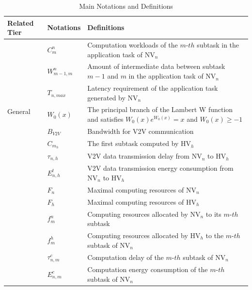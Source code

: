 \documentclass[lettersize,journal]{IEEEtran}
\begin{document}





\begin{table}[!t]
\caption{Main Notations and Definitions}
\label{tab:table1}
\centering
\begin{tabular}{|m{1.0cm}<{\centering}|m{1.0cm}<{\centering}|m{5.6cm}<{\centering}|}
\hline
Related Tier & Notations & Definitions\\
\hline
\multirow{8}{*}{General} & $C^n_m$ & Computation workloads of the $m\mbox{-}th$ subtask in the application task of NV$_n$\\
\cline{2-3} &
$W^n_{m-1,m}$ & Amount of intermediate data between subtask $m-1$ and $m$ in the application task of NV$_n$\\
\cline{2-3} &
$T_{n,max}$ & Latency requirement of the application task generated by NV$_n$\\
\cline{2-3} &
$W_0(x)$ & The principal branch of the Lambert W function \cite{ref28} and satisfies $W_0(x)e^{W_0(x)}=x$ and $W_0(x)\geq -1$\\
\hline
\multirow{13}{*}{Tier-1} & $B_{V2V}$ & Bandwidth for V2V communication\\
\cline{2-3} &
$C_{m_h}$ & The first subtask computed by HV$_h$\\
\cline{2-3} &
$\tau_{n,h}$ & V2V data transmission delay from NV$_n$ to HV$_h$\\
\cline{2-3} &
$E^{t}_{n,h}$ & V2V data transmission energy consumption from NV$_n$ to HV$_h$\\
\cline{2-3} &
$F_n$ & Maximal computing resources of NV$_n$\\
\cline{2-3} &
$F_h$ & Maximal computing resources of HV$_h$\\
\cline{2-3} &
$f^n_m$ & Computing resources allocated by NV$_n$ to its $m\mbox{-}th$ subtask\\
\cline{2-3} &
$f^h_m$ & Computing resources allocated by HV$_h$ to the $m\mbox{-}th$ subtask of NV$_n$\\
\cline{2-3} &
$\tau_{n,m}^c$ & Computation delay of the $m\mbox{-}th$ subtask of NV$_n$\\
\cline{2-3} &
$E_{n,m}^c$ & Computation energy consumption of the $m\mbox{-}th$ subtask of NV$_n$\\

\end{tabular}
\end{table}
\end{document}
